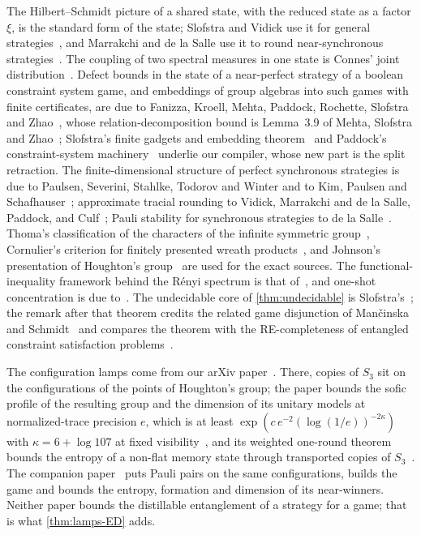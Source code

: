 The Hilbert--Schmidt picture of a shared state, with the reduced state as a factor $\xi$, is the standard form of the state; Slofstra
and Vidick use it for general strategies~\cite{SV18}, and Marrakchi and de la Salle use it to round near-synchronous
strategies~\cite{MdlS23}. The coupling of two spectral measures in one state is Connes' joint distribution~\cite{Con76}. Defect bounds
in the state of a near-perfect strategy of a boolean constraint system game, and embeddings of group algebras into such games with
finite certificates, are due to Fanizza, Kroell, Mehta, Paddock, Rochette, Slofstra and Zhao~\cite{FKMPRSZ25}, whose
relation-decomposition bound is Lemma~3.9 of Mehta, Slofstra and Zhao~\cite{MSZ23}; Slofstra's finite gadgets
and embedding theorem~\cite{Slo19,Slo20} and Paddock's constraint-system machinery~\cite{Pad22} underlie our compiler, whose new part is
the split retraction. The finite-dimensional structure of perfect synchronous strategies is due to Paulsen, Severini, Stahlke,
Todorov and Winter and to Kim, Paulsen and Schafhauser~\cite{PSSTW16,KPS18}; approximate tracial rounding to Vidick, Marrakchi and
de la Salle, Paddock, and Culf~\cite{Vid22,MdlS23,Pad22,Cul26}; Pauli stability for synchronous strategies to de la Salle~\cite{dlS22}.
Thoma's classification of the characters of the infinite symmetric group~\cite{Tho64}, Cornulier's criterion for finitely presented
wreath products~\cite{Cor06}, and Johnson's presentation of Houghton's group~\cite{Joh99,Lee12} are used for the exact sources. The
functional-inequality framework behind the R\'enyi spectrum is that of~\cite{BCLS95,Rum10}, and one-shot concentration is due
to~\cite{Vid99,LP01,BD10,Nie99}. The undecidable core of \cref{thm:undecidable} is Slofstra's~\cite{Slo19}; the remark after that
theorem credits the related game disjunction of Man\v{c}inska and Schmidt~\cite{MaSc23} and compares the theorem with the
RE-completeness of entangled constraint satisfaction problems~\cite{CuMa25}.

The configuration lamps come from our arXiv paper~\cite{DM-lamps}. There, copies of $S_3$ sit on the configurations of the points of
Houghton's group; the paper bounds the sofic profile of the resulting group and the dimension of its unitary models at
normalized-trace precision $e$, which is at least $\exp(c\,e^{-2}(\log(1/e))^{-2\kappa})$ with $\kappa=6+\log107$ at fixed
visibility~\cite[Theorem~A]{DM-lamps}, and its weighted
one-round theorem bounds the entropy of a non-flat memory state through transported copies of $S_3$~\cite[Theorem~10.1]{DM-lamps}.
The companion paper~\cite{DM-game} puts Pauli pairs on the same configurations, builds the game and bounds the entropy, formation
and dimension of its near-winners. Neither paper bounds the distillable entanglement of a strategy for a game; that is what
\cref{thm:lamps-ED} adds.

